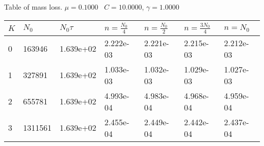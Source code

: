 \begin{center}
Table of mass loss. $\mu = 0.1000$ \, $C = 10.0000$, $\gamma = 1.0000$
  
\begin{tabular}{|p{0.8in}|p{0.8in}|p{0.8in}|p{0.8in}|p{0.8in}|p{0.8in}|p{0.8in}|} \hline
$K$ &$N_0$ &$N_0 \tau$ &$n = \frac{N_0}{4}$ &$n = \frac{N_0}{2}$ &$n = \frac{3N_0}{4}$ &$n = N_0$ \\ \hline 
0 &163946 &1.639e+02 &2.222e-03 &2.221e-03 &2.215e-03 &2.212e-03 \\ \hline 
1 &327891 &1.639e+02 &1.033e-03 &1.032e-03 &1.029e-03 &1.027e-03 \\ \hline 
2 &655781 &1.639e+02 &4.993e-04 &4.983e-04 &4.968e-04 &4.959e-04 \\ \hline 
3 &1311561 &1.639e+02 &2.455e-04 &2.449e-04 &2.442e-04 &2.437e-04 \\ \hline 

\end{tabular}\\[20pt]
\end{center}
